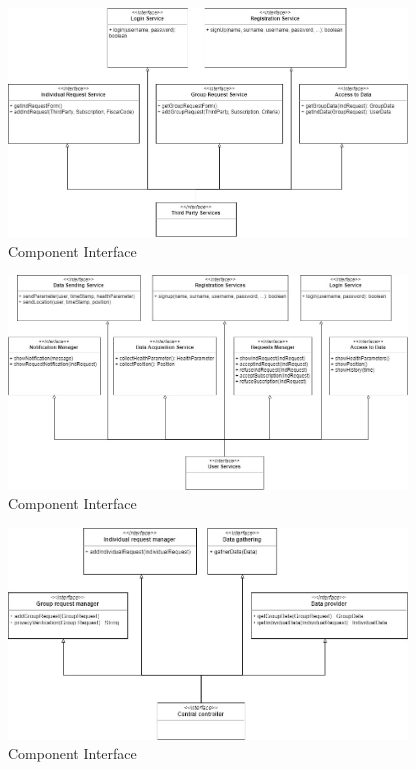 \begin{figure}
    \centering
    \includegraphics[width=300pt]{images/CompInterfaces/Component_interfaces3.jpg}
    \caption{Component Interface}
\end{figure}

\begin{figure}
    \centering
    \includegraphics[width=300pt]{images/CompInterfaces/Component_interfaces4.jpg}
    \caption{Component Interface}
\end{figure}


\begin{figure}
    \centering
    \includegraphics[width=300pt]{images/CompInterfaces/Component_interfaces1.jpg}
    \caption{Component Interface}
\end{figure}


